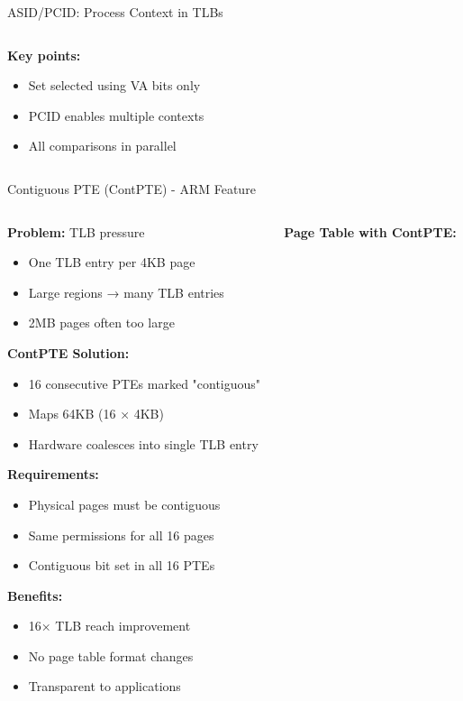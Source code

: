 \documentclass[aspectratio=169,12pt]{beamer}
\begin{document}
\begin{frame}{ASID/PCID: Process Context in TLBs}
\begin{columns}[T]
\begin{column}{0.52\textwidth}
\textbf{Key points:}
\begin{itemize}
\item Set selected using VA bits only
\item PCID enables multiple contexts
\item All comparisons in parallel
\end{itemize}
\end{column}
\end{columns}
\end{frame}

\begin{frame}{Contiguous PTE (ContPTE) - ARM Feature}
\begin{columns}[T]
\begin{column}{0.45\textwidth}
\textbf{Problem:} TLB pressure
\begin{itemize}
\item One TLB entry per 4KB page
\item Large regions → many TLB entries
\item 2MB pages often too large
\end{itemize}

\textbf{ContPTE Solution:}
\begin{itemize}
\item 16 consecutive PTEs marked "contiguous"
\item Maps 64KB (16 × 4KB)
\item Hardware coalesces into single TLB entry
\end{itemize}

\textbf{Requirements:}
\begin{itemize}
\item Physical pages must be contiguous
\item Same permissions for all 16 pages
\item Contiguous bit set in all 16 PTEs
\end{itemize}

\textbf{Benefits:}
\begin{itemize}
\item 16× TLB reach improvement
\item No page table format changes
\item Transparent to applications
\end{itemize}
\end{column}

\begin{column}{0.55\textwidth}
\textbf{Page Table with ContPTE:}
\begin{center}
\end{center}
\end{column}
\end{columns}
\end{frame}
\end{document}
